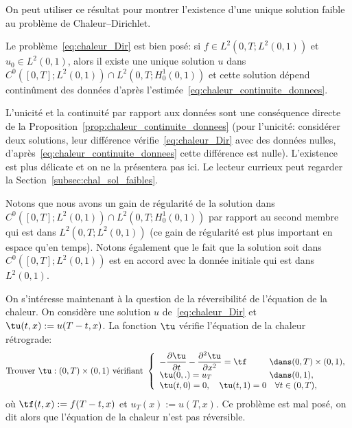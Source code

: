 \documentclass[12pt,a4paper,twoside]{article}
\begin{document}
On peut utiliser ce r\'esultat pour montrer l'existence d'une unique solution faible
au probl\`eme de Chaleur--Dirichlet.


\begin{proposition}
  \label{prop:chal_sol_faibles}
  Le probl\`eme~\eqref{eq:chaleur_Dir} est bien pos\'e:
  si $f \in L^2(0,T;L^2(0,1))$ et $u_0 \in L^2(0,1)$,
  alors il existe une unique solution $u$
  dans $C^0([0,T];L^2(0,1)) \cap L^2(0,T;H_0^1(0,1))$
  et cette solution d\'epend contin\^ument des donn\'ees d'apr\`es
  l'estim\'ee~\eqref{eq:chaleur_continuite_donnees}.
\end{proposition}
L'unicit\'e et la continuit\'e par rapport aux donn\'ees sont une cons\'equence directe
de la Proposition~\ref{prop:chaleur_continuite_donnees}
(pour l'unicit\'e: consid\'erer deux solutions, leur diff\'erence v\'erifie~\eqref{eq:chaleur_Dir}
avec des donn\'ees nulles, d'apr\`es~\eqref{eq:chaleur_continuite_donnees}
cette diff\'erence est nulle).
L'existence est plus d\'elicate et on ne la pr\'esentera pas ici.
Le lecteur currieux peut regarder la Section~\ref{subsec:chal_sol_faibles}.

Notons que nous avons un gain de r\'egularit\'e de la solution
dans $C^0([0,T];L^2(0,1)) \cap L^2(0,T;H_0^1(0,1))$
par rapport au second membre qui est dans $L^2(0,T;L^2(0,1))$
(ce gain de r\'egularit\'e est plus important en espace qu'en temps).
Notons \'egalement que le fait que la solution soit dans $C^0([0,T];L^2(0,1))$
est en accord avec la donn\'ee initiale qui est dans $L^2(0,1)$.


On s'int\'eresse maintenant \`a la question de la r\'eversibilit\'e de l'\'equation
de la chaleur. On consid\`ere une solution $u$ de~\eqref{eq:chaleur_Dir}
et $\tu(t,x) := u(T-t,x)$.
La fonction $\tu$ v\'erifie l'\'equation de la chaleur r\'etrograde:
\begin{equation}
  \label{eq:chaleur_retro}
  \text{Trouver $\tu : (0,T) \times (0,1)$ v\'erifiant }
  \left\{
    \begin{array}{l l}
      -\dfrac{\partial \tu}{\partial t} - \dfrac{\partial^2 \tu}{\partial x^2} = \tf 
      &\!\!\!\! \dans (0,T) \times (0,1) ,
      \\
      \tu(0,.) = u_T 
      &\!\!\!\! \dans (0,1) ,
      \\
      \tu(t,0) = 0 , \quad \tu(t,1) = 0 & \forall t \in (0,T) ,
    \end{array}
  \right.
\end{equation}
o\`u $\tf(t,x) := f(T-t,x)$ et $u_T(x) := u(T,x)$.
Ce probl\`eme est mal pos\'e, on dit alors que l'\'equation de la chaleur n'est pas r\'eversible.
\end{document}
